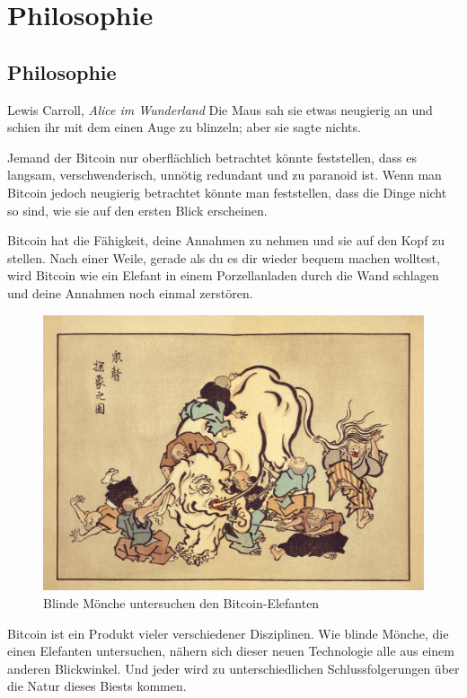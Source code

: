 \part{Philosophie}
\label{ch:philosophy}
\chapter*{Philosophie}

\begin{chapquote}{Lewis Carroll, \textit{Alice im Wunderland}}
Die Maus sah sie etwas neugierig an und schien ihr mit dem einen Auge zu
blinzeln; aber sie sagte nichts.
\end{chapquote}

Jemand der Bitcoin nur oberflächlich betrachtet könnte feststellen, dass es
langsam, verschwenderisch, unnötig redundant und zu paranoid ist. Wenn man
Bitcoin jedoch neugierig betrachtet könnte man feststellen, dass die Dinge nicht
so sind, wie sie auf den ersten Blick erscheinen.

Bitcoin hat die Fähigkeit, deine Annahmen zu nehmen und sie auf den Kopf zu
stellen. Nach einer Weile, gerade als du es dir wieder bequem machen wolltest,
wird Bitcoin wie ein Elefant in einem Porzellanladen durch die Wand schlagen und
deine Annahmen noch einmal zerstören.

\begin{figure}
  \includegraphics[width=\textwidth]{assets/images/blind-monks.jpg}
  \caption{Blinde Mönche untersuchen den Bitcoin-Elefanten}
  \label{fig:blind-monks}
\end{figure}

Bitcoin ist ein Produkt vieler verschiedener Disziplinen. Wie blinde Mönche, die
einen Elefanten untersuchen, nähern sich dieser neuen Technologie alle aus einem
anderen Blickwinkel. Und jeder wird zu unterschiedlichen Schlussfolgerungen über
die Natur dieses Biests kommen.

